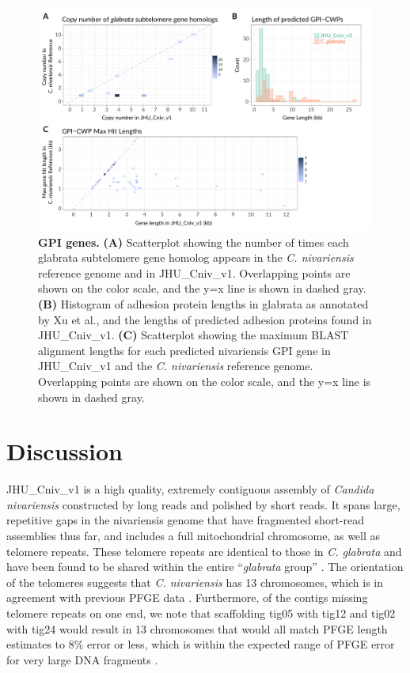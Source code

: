 \begin{figure}[!hb]
\centering
\includegraphics[width = 1\linewidth,keepaspectratio]{figure/gpicwps.pdf}
\caption[GPI genes]{{\bf GPI genes.} {\bf (A)} Scatterplot showing the number of times each glabrata subtelomere gene homolog appears in the \textit{C. nivariensis} reference genome and in JHU\_Cniv\_v1. Overlapping points are shown on the color scale, and the y=x line is shown in dashed gray. {\bf (B)} Histogram of adhesion protein lengths in glabrata as annotated by Xu et al., and the lengths of predicted adhesion proteins found in JHU\_Cniv\_v1. {\bf (C)} Scatterplot showing the maximum BLAST alignment lengths for each predicted nivariensis GPI gene in JHU\_Cniv\_v1 and the \textit{C. nivariensis} reference genome. Overlapping points are shown on the color scale, and the y=x line is shown in dashed gray. }
\label{fig:gpicwps}
\end{figure}


\section{Discussion}
\label{sec:discuss}

JHU\_Cniv\_v1 is a high quality, extremely contiguous assembly of \textit{Candida nivariensis} constructed by long reads and polished by short reads. It spans large, repetitive gaps in the nivariensis genome that have fragmented short-read assemblies thus far, and includes a full mitochondrial chromosome, as well as telomere repeats. These telomere repeats are identical to those in \textit{C. glabrata} and have been found to be shared within the entire “\textit{glabrata} group” \citep{Gabaldon2013-bk}. The orientation of the telomeres suggests that \textit{C. nivariensis} has 13 chromosomes, which is in agreement with previous PFGE data \citep{Gabaldon2013-bk}. Furthermore, of the contigs missing telomere repeats on one end, we note that scaffolding tig05 with tig12 and tig02 with tig24 would result in 13 chromosomes that would all match PFGE length estimates to 8\% error or less, which is within the expected range of PFGE error for very large DNA fragments \citep{Cutting1988-mw}.

